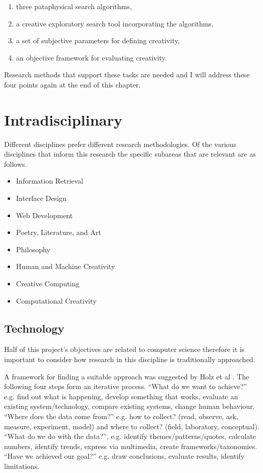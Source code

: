 \label{s:objectives}
\begin{enumerate}
  \item three pataphysical search algorithms,
  \item a creative exploratory search tool incorporating the algorithms,
  \item a set of subjective parameters for defining creativity,
  \item an objective framework for evaluating creativity.
\end{enumerate}

Research methods that support these tasks are needed and I will address these four points again at the end of this chapter.


\section{Intradisciplinary}

Different disciplines prefer different research methodologies. Of the various disciplines that inform this research the specific subareas that are relevant are as follows.

\begin{itemize}
  \item Information Retrieval
  \item Interface Design
  \item Web Development
  \item Poetry, Literature, and Art
  \item Philosophy
  \item Human and Machine Creativity
  \item Creative Computing
  \item Computational Creativity
\end{itemize}


\subsection{Technology}

Half of this project's objectives are related to computer science therefore it is important to consider how research in this discipline is traditionally approached.

A framework for finding a suitable approach was suggested by Holz et al \autocite*{Holz2006}. The following four steps form an iterative process. ``What do we want to achieve?'' e.g. find out what is happening, develop something that works, evaluate an existing system/technology, compare existing systems, change human behaviour. ``Where does the data come from?'' e.g. how to collect? (read, observe, ask, measure, experiment, model) and where to collect? (field, laboratory, conceptual). ``What do we do with the data?'', e.g. identify themes/patterns/quotes, calculate numbers, identify trends, express via multimedia, create frameworks/taxonomies. ``Have we achieved our goal?'' e.g. draw conclusions, evaluate results, identify limitations.

